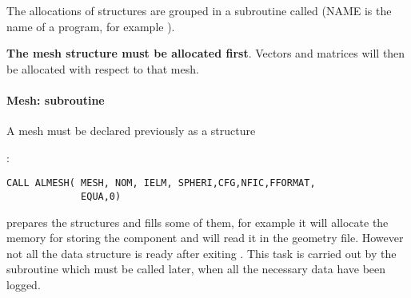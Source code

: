The allocations of structures are grouped in a subroutine called
 (NAME is the name of a \telemacsystem program, for example
\artemis).

\textbf{The mesh structure must be allocated first}. Vectors and matrices will
then be allocated with respect to that mesh.

\paragraph{Mesh: subroutine }

A mesh must be declared previously as a  structure

:
\begin{lstlisting}[language=TelFortran]
CALL ALMESH( MESH, NOM, IELM, SPHERI,CFG,NFIC,FFORMAT,
             EQUA,0)
\end{lstlisting}

 prepares the  structures and fills some of
them, for example it will allocate the memory for storing the component
 and will read it in the geometry file. However not all the data
structure is ready after exiting . This task is carried out by
the subroutine  which must be called later, when all the
necessary data have been logged.

